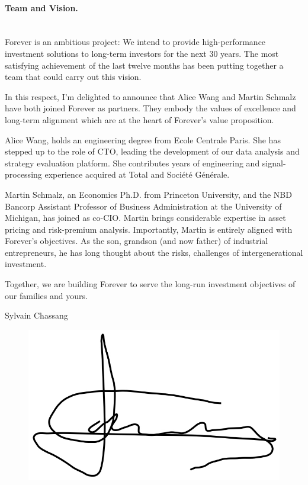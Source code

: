 \documentclass[letterpaper,12pt]{article}
\begin{document}
 
\paragraph{Team and Vision.} $ $\\
Forever is an ambitious project: We intend to provide high-performance investment solutions to long-term investors for the next 30 years. The most satisfying achievement of the last twelve months has been putting together a team that could  carry out this vision.  

In this respect, I'm delighted to announce that Alice Wang and Martin Schmalz have both joined Forever as partners. They embody the values of excellence and long-term alignment which are at the heart of Forever's value proposition.

Alice Wang, holds an engineering degree from Ecole Centrale Paris. She has stepped up to the role of CTO, leading the development of our data analysis and strategy evaluation platform. She contributes years of engineering and signal-processing experience acquired at Total and Soci\'et\'e G\'en\'erale.

Martin Schmalz,  an  Economics Ph.D. from Princeton University, and the NBD Bancorp Assistant Professor of Business Administration at the University of Michigan, has joined as co-CIO. Martin brings considerable expertise in asset pricing and risk-premium analysis. Importantly, Martin is entirely aligned with Forever's objectives. As the son, grandson (and now father) of industrial entrepreneurs, he has long thought about the risks, challenges of intergenerational investment.

Together, we  are building Forever to serve the long-run investment objectives of our families and yours.\\
\smallskip
 
\noindent Sylvain Chassang
\vspace{-10pt}
\begin{figure}[!h]
\includegraphics[width=.25\textwidth]{signature.png}
\end{figure}

% 


 
\end{document}
